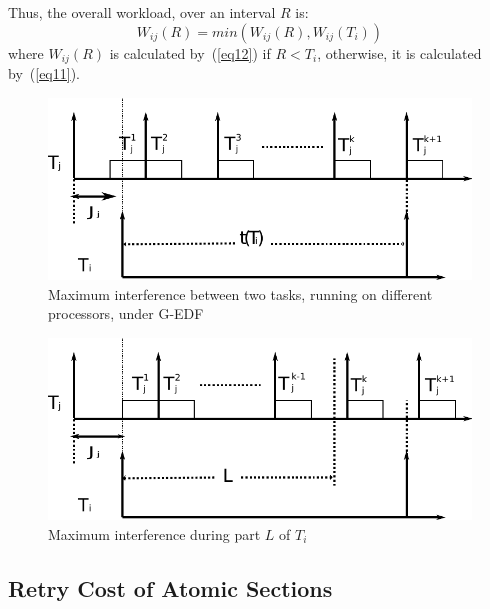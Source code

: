 \documentclass{sig-alternate}
\begin{document}
Thus, the overall workload, over an interval $R$ is:
\begin{equation}
W_{ij}\left(R\right)=min\left(W_{ij}\left(R\right),W_{ij}\left(T_{i}\right)\right)\label{eq13}\end{equation}
where $W_{ij}(R)$ is calculated by~(\ref{eq12}) if $R<T_i$, otherwise, it is calculated by~(\ref{eq11}).

\begin{figure}%
\centering
\includegraphics[bb=0bp 0bp 542bp 162bp,scale=0.5]{figures/figure9-a}
\caption{\label{fig1} Maximum interference between two tasks, running on different processors, under G-EDF}
\end{figure}


\begin{figure}
\centering
\includegraphics[bb=0bp 0bp 542bp 162bp,scale=0.5]{figures/figure9-b}
\caption{\label{fig2}Maximum interference during part $L$ of $T_{i}$}
\end{figure}



\subsection{Retry Cost of Atomic Sections}
\end{document}
